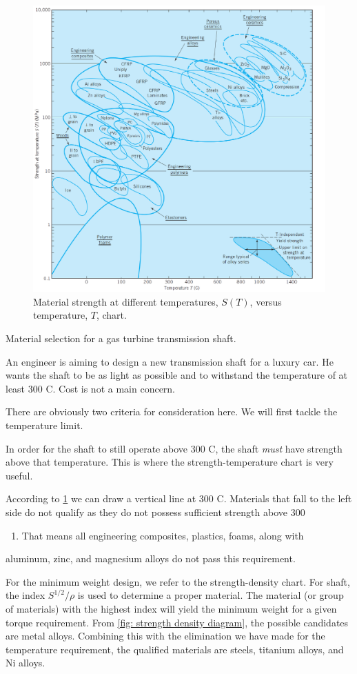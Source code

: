 \documentclass[a4paper,openany,12pt]{book}
\begin{document}
\begin{enumerate}
\begin{figure}[htbp]
\centering
\includegraphics[width=.9\linewidth]{pictures/Material-selection/strength-temperature-diagram.pdf}
\caption{\label{fig: strength temperature diagram}Material strength at different temperatures, \(S(T)\), versus temperature, \(T\), chart. \cite{ashby2010materials}}
\end{figure}

Material selection for a gas turbine transmission shaft.

An engineer is aiming to design a new transmission shaft for a luxury
car. He wants the shaft to be as light as possible and to withstand the
temperature of at least 300 C. Cost is not a main concern.

There are obviously two criteria for consideration here. We will first
tackle the temperature limit.

In order for the shaft to still operate above 300 C, the shaft \emph{must}
have strength above that temperature. This is where the
strength-temperature chart is very useful.

According to \ref{fig: strength temperature diagram} we can draw a vertical line at 300 C. Materials that fall to the left
side do not qualify as they do not possess sufficient strength above 300
\begin{enumerate}
\item That means all engineering composites, plastics, foams, along with
\end{enumerate}
aluminum, zinc, and magnesium alloys do not pass this requirement.

For the minimum weight design, we refer to the strength-density chart.
For shaft, the index \(S^{1/2}/\rho\) is used to determine a proper
material. The material (or group of materials) with the highest index
will yield the minimum weight for a given torque requirement. From
\ref{fig: strength density diagram}, the
possible candidates are metal alloys. Combining this with the
elimination we have made for the temperature requirement, the qualified
materials are steels, titanium alloys, and Ni alloys.
\end{enumerate}
\end{document}
